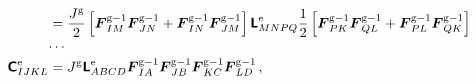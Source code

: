 \documentclass[10pt,letterpaper,oneside]{report}
\newcommand{\ten}[1]{\mbox{\boldmath $#1$}{}}
\newcommand{\tenf}[1]{\mbox{{\sffamily{\bfseries {#1}}}}}
\newcommand{\scas}[1]{\mbox{{\scriptsize{${\rm{#1}}$}}}{}}
\begin{document}
\begin{itemize}
\begin{align}
\\
={}& \frac{J^{\scas{g}}}{2} \left[ \ten{F}^{\scas{g}-1}_{IM} \ten{F}^{\scas{g}-1}_{JN} + \ten{F}^{\scas{g}-1}_{IN} \ten{F}^{\scas{g}-1}_{JM} \right] \tenf{L}^{\scas{e}}_{MNPQ} \frac{1}{2} \left[ \ten{F}^{\scas{g}-1}_{PK} \ten{F}^{\scas{g}-1}_{QL} + \ten{F}^{\scas{g}-1}_{PL} \ten{F}^{\scas{g}-1}_{QK} \right] 
\notag \\
\cdots{}& \notag \\
\tenf{C}^{\scas{e}}_{IJKL} ={}& J^{\scas{g}} \tenf{L}^{\scas{e}}_{ABCD} \ten{F}^{\scas{g}-1}_{IA} \ten{F}^{\scas{g}-1}_{JB} \ten{F}^{\scas{g}-1}_{KC} \ten{F}^{\scas{g}-1}_{LD} \, , 

\end{align}
\end{itemize}
\end{document}
